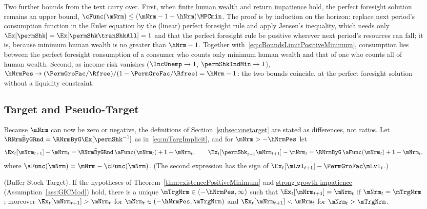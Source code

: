 \documentclass[\econtexRoot/BufferStockTheory]{subfiles}
\begin{document}
Two further bounds from the text carry over.
First, when \hyperlink{FHWC}{finite human wealth} and \hyperlink{RIC}{return impatience} hold, the perfect foresight solution remains an upper bound, $\cFunc(\mNrm)\leq(\mNrm-1+\hNrm)\MPCmin$.
The proof is by induction on the horizon: replace next period's consumption function in the Euler equation by the (linear) perfect foresight rule and apply Jensen's inequality, which needs only $\Ex[\permShk]=\Ex[\permShk\tranShkAll]=1$ and that the perfect foresight rule be positive wherever next period's resources can fall; it is, because minimum human wealth is no greater than $\hNrm-1$.
Together with~\eqref{eq:cBoundsLimitPositiveMinimum}, consumption lies between the perfect foresight consumption of a consumer who counts only minimum human wealth and that of one who counts all of human wealth.
Second, as income risk vanishes ($\IncUnemp\rightarrow 1$, $\permShkIndMin\rightarrow 1$), $\hNrmPes\rightarrow(\PermGroFac/\Rfree)/(1-\PermGroFac/\Rfree)=\hNrm-1$: the two bounds coincide, at the perfect foresight solution without a liquidity constraint.

\subsection{Target and Pseudo-Target}\label{subsec:PositiveMinimumTargets}

Because $\mNrm$ can now be zero or negative, the definitions of Section~\ref{subsec:onetarget} are stated as differences, not ratios.
Let $\bar{\RNrmByGRnd}=\RNrmByG\Ex[\permShk^{-1}]$ as in~\eqref{eq:mTargImplicit}, and for $\mNrm>-\hNrmPes$ let
\begin{equation}\label{eq:difFuncsPositiveMinimum}
  \Ex_{t}[\mNrm_{t+1}]-\mNrm_{t}=\bar{\RNrmByGRnd}\,\aFunc(\mNrm_{t})+1-\mNrm_{t},\qquad
  \Ex_{t}[\permShk_{t+1}\mNrm_{t+1}]-\mNrm_{t}=\RNrmByG\,\aFunc(\mNrm_{t})+1-\mNrm_{t},
\end{equation}
where $\aFunc(\mNrm)=\mNrm-\cFunc(\mNrm)$.
(The second expression has the sign of $\Ex_{t}[\mLvl_{t+1}]-\PermGroFac\mLvl_{t}$.)

\begin{theorem}(Buffer Stock Target).\label{thm:targetPositiveMinimum}
If the hypotheses of Theorem~\ref{thm:existencePositiveMinimum} and \hyperlink{GICMod}{strong growth impatience} (Assumption~\ref{ass:GICMod}) hold, there is a unique $\mTrgNrm\in(-\hNrmPes,\infty)$ such that $\Ex_{t}[\mNrm_{t+1}]=\mNrm_{t}$ if $\mNrm_{t}=\mTrgNrm$; moreover $\Ex_{t}[\mNrm_{t+1}]>\mNrm_{t}$ for $\mNrm_{t}\in(-\hNrmPes,\mTrgNrm)$ and $\Ex_{t}[\mNrm_{t+1}]<\mNrm_{t}$ for $\mNrm_{t}>\mTrgNrm$.
\end{theorem}
\end{document}
